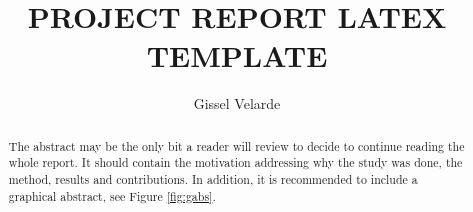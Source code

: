 \documentclass[11pt,a4paper]{article}
\title{PROJECT REPORT LATEX TEMPLATE}
\author{ Gissel Velarde }
\begin{document}
\maketitle	

 \tableofcontents
 \pagebreak
\begin{abstract}
The abstract may be the only bit a reader will review to decide to continue reading the whole report. It should contain the motivation addressing why the study was done, the method, results and contributions. In addition, it is recommended to include a graphical abstract, see Figure \ref{fig:gabs}.
\end{abstract}

 
\end{document}
